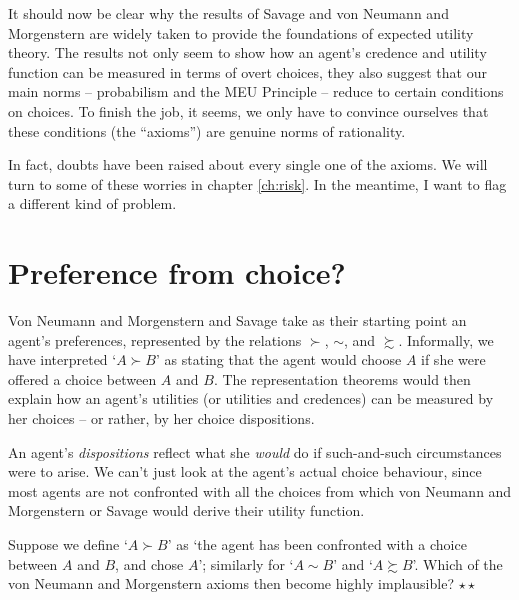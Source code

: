 
It should now be clear why the results of Savage and von Neumann and
Morgenstern are widely taken to provide the foundations of expected
utility theory. The results not only seem to show how an agent's
credence and utility function can be measured in terms of overt
choices, they also suggest that our main norms -- probabilism and the
MEU Principle -- reduce to certain conditions on choices. To finish
the job, it seems, we only have to convince ourselves that these
conditions (the ``axioms'') are genuine norms of rationality.

In fact, doubts have been raised about every single one of the axioms.
We will turn to some of these worries in chapter \ref{ch:risk}. In the
meantime, I want to flag a different kind of problem.

\section{Preference from choice?}\label{sec:preferences-choices}

Von Neumann and Morgenstern and Savage take as their starting point an
agent's preferences, represented by the relations $\succ$, $\sim$, and
$\succsim$. Informally, we have interpreted `$A \succ B$' as stating
that the agent would choose $A$ if she were offered a choice between
$A$ and $B$. The representation theorems would then explain how an
agent's utilities (or utilities and credences) can be measured by her
choices -- or rather, by her choice dispositions.

An agent's \emph{dispositions} reflect what she \emph{would} do if
such-and-such circumstances were to arise. We can't just look at the
agent's actual choice behaviour, since most agents are not confronted
with all the choices from which von Neumann and Morgenstern or Savage
would derive their utility function.

\begin{exercise}
  Suppose we define `$A \succ B$' as `the agent has been confronted
  with a choice between $A$ and $B$, and chose $A$'; similarly for
  `$A\sim B$' and `$A \succsim B$'. Which of the von Neumann and
  Morgenstern axioms then become highly implausible? $\star\star$
\end{exercise}

